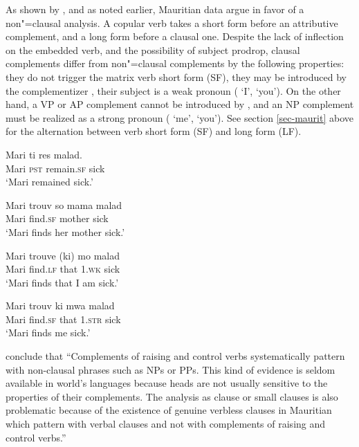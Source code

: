 \documentclass[output=paper
	        ,collection
	        ,collectionchapter
 	        ,biblatex
                ,babelshorthands
                ,newtxmath
                ,draftmode
                ,colorlinks, citecolor=brown
]{langscibook}
\begin{document}
As shown by \citet{HenriandLaurens2011}, and as noted earlier, Mauritian data argue in favor of a non"=clausal
analysis. A copular verb takes a short form before an attributive complement, and a long form before
a clausal one. Despite the lack of inflection on the embedded verb, and the possibility of subject
prodrop,  clausal complements differ from non"=clausal complements by the following properties: they
do not trigger the matrix verb short form (SF), they may be introduced by the complementizer ,
their subject is a weak pronoun ( `I',  `you'). On the other hand, a VP or AP complement
cannot be introduced by , and an NP complement must be realized as a strong pronoun ( `me',
 `you'). See section \ref{sec-maurit} above for the alternation between verb short form (SF) and long form (LF).

\begin{exe}
\ex \begin{xlist}
\ex 
\gll Mari ti res  malad.\\
     Mari \textsc{pst} remain.\textsc{sf} sick\\\hfill\citep[]{HenriandLaurens2011}
\glt `Mari remained sick.'

\ex 
\gll Mari trouv  so mama malad\\
     Mari find.\textsc{sf} \POSS{} mother sick\\
\glt `Mari finds her mother sick.'

\ex 
\gll Mari trouve (ki) mo malad\\
     Mari find.\textsc{lf} that 1\SG.\textsc{wk} sick\\
\glt `Mari finds that I am sick.'

\ex 
\gll Mari trouv ki mwa malad\\
     Mari find.\textsc{sf} that 1\SG.\textsc{str} sick\\
\glt `Mari finds me sick.'
\end{xlist}
\end{exe}

\citet[]{HenriandLaurens2011} conclude that ``Complements of raising and control verbs systematically pattern with non-clausal phrases such as NPs or PPs. This kind of evidence is seldom available in world's languages because heads are not usually sensitive to the properties of their complements. The analysis as clause or small clauses is also problematic because of the existence of genuine verbless clauses in Mauritian which pattern with verbal clauses and not with complements of raising and control verbs.''
\end{document}
